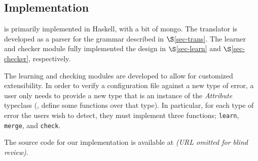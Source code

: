 \subsection{Implementation}

\app is primarily implemented in Haskell, with a bit of mongo.
The translator is developed as a parser for the grammar described in $\S$\ref{sec-trans}. 
The learner and checker module fully implemented the design in $\S$\ref{sec-learn} and $\S$\ref{sec-checker}, respectively. 
 
The learning and checking modules are developed to allow
for customized extensibility. In order to verify a configuration file
against a new type of error, a user only needs to provide a new type
that is an instance of the \textit{Attribute} typeclass (\ie, define some
functions over that type). 
In particular, for each type of error the users
wish to detect, they must implement three functions;
\lstinline{learn}, \lstinline{merge}, and \lstinline{check}.

The source code for our implementation is available at {\em (URL omitted for blind review)}.
